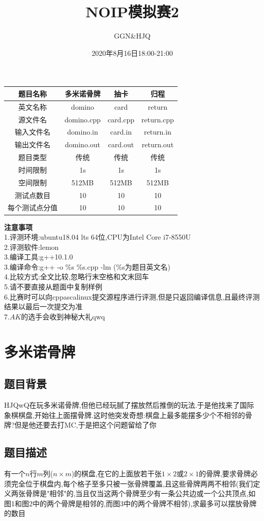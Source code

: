 \documentclass[12pt]{ctexart}
\title{\textbf{NOIP模拟赛2}}
\author{GGN\&HJQ}
\date{2020年8月16日18:00-21:00}
\begin{document}
	\maketitle
	\begin{center}
		\begin{tabular}{|c|c|c|c|}
			\hline 题目名称&多米诺骨牌&抽卡&归程\\
			\hline 英文名称&domino&card&return\\
			\hline 源文件名&domino.cpp&card.cpp&return.cpp\\
			\hline 输入文件名&domino.in&card.in&return.in\\
			\hline 输出文件名&domino.out&card.out&return.out\\
			\hline 题目类型&传统&传统&传统\\
			\hline 时间限制&1s&1s&1s\\
			\hline 空间限制&512MB&512MB&512MB\\
			\hline 测试点数目&10&10&10\\
			\hline 每个测试点分值&10&10&10\\
			\hline
		\end{tabular}
	\end{center}
	\textbf{注意事项}\\
	1.评测环境:ubuntu18.04 lts 64位,CPU为Intel Core i7-8550U\\
	2.评测软件:lemon\\
	3.编译工具:g++10.1.0\\
	3.编译命令:g++ -o \%s \%s.cpp -lm (\%s为题目英文名)\\
	4.比较方式:全文比较,忽略行末空格和文末回车\\
	5.请不要直接从题面中复制样例\\
	6.比赛时可以向cppascalinux提交源程序进行评测,但是只返回编译信息,且最终评测结果以最后一次提交为准\\
	7.$AK$的选手会收到神秘大礼qwq
	\newpage
	\section{多米诺骨牌}
	\subsection{题目背景}
	HJQwQ在玩多米诺骨牌,但他已经玩腻了摆放然后推倒的玩法.于是他找来了国际象棋棋盘,开始往上面摆骨牌.这时他突发奇想:棋盘上最多能摆多少个不相邻的骨牌?但是他还要去打MC,于是把这个问题留给了你
	\subsection{题目描述}
	有一个$n$行$m$列($n\times m$)的棋盘,在它的上面放若干张$1\times2$或$2\times1$的骨牌,要求骨牌必须完全位于棋盘内,每个格子至多只被一张骨牌覆盖,且这些骨牌两两不相邻(我们定义两张骨牌是"相邻"的,当且仅当这两个骨牌至少有一条公共边或一个公共顶点,如图1和图2中的两个骨牌是相邻的,而图3中的两个骨牌不相邻),求最多可以摆放骨牌的数目
\end{document}
